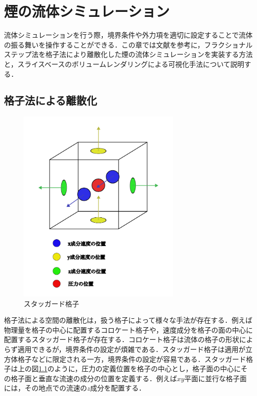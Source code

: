 \documentclass[a4j,12pt]{jreport}
\begin{document}
\chapter{煙の流体シミュレーション}
流体シミュレーションを行う際，境界条件や外力項を適切に設定することで流体の振る舞いを操作することができる．この章では文献\cite{fedkiw}を参考に，フラクショナルステップ法を格子法により離散化した煙の流体シミュレーションを実装する方法と，スライスベースのボリュームレンダリングによる可視化手法について説明する．%

\section{格子法による離散化}
\begin{figure}[H]
\begin{center}
\includegraphics[width=80mm]{images/3dstaggerd.png}
\caption{スタッガード格子}
\label{fig:staggerd}
\end{center}
\end{figure}
格子法による空間の離散化は，扱う格子によって様々な手法が存在する．例えば物理量を格子の中心に配置するコロケート格子や，速度成分を格子の面の中心に配置するスタッガード格子が存在する．コロケート格子は流体の格子の形状によらず適用できるが，境界条件の設定が煩雑である．スタッガード格子は適用が立方体格子などに限定される一方，境界条件の設定が容易である．スタッガード格子は上の図\ref{fig:staggerd}のように，圧力の定義位置を格子の中心とし，格子面の中心にその格子面と垂直な流速の成分の位置を定義する．例えば$xy$平面に並行な格子面には，その地点での流速の$z$成分を配置する．
\end{document}
